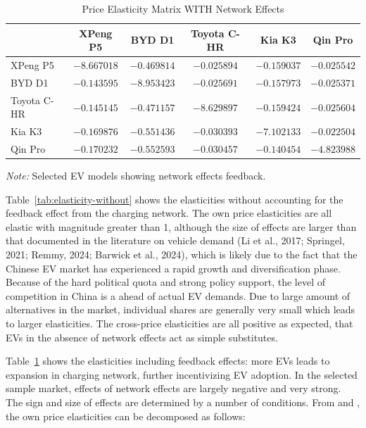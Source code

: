 \documentclass[12pt]{article}
\begin{document}
\begin{table}[!htbp]
\centering
\caption{Price Elasticity Matrix WITH Network Effects}
\label{tab:elasticity-with}
\begin{tabular}{@{}lccccc@{}}
\toprule
& XPeng P5 & BYD D1 & Toyota C-HR & Kia K3 & Qin Pro \\
\midrule
XPeng P5 & $-8.667018$ & $-0.469814$ & $-0.025894$ & $-0.159037$ & $-0.025542$ \\
BYD D1 & $-0.143595$ & $-8.953423$ & $-0.025691$ & $-0.157973$ & $-0.025371$ \\
Toyota C-HR & $-0.145145$ & $-0.471157$ & $-8.629897$ & $-0.159424$ & $-0.025604$ \\
Kia K3 & $-0.169876$ & $-0.551436$ & $-0.030393$ & $-7.102133$ & $-0.022504$ \\
Qin Pro & $-0.170232$ & $-0.552593$ & $-0.030457$ & $-0.140454$ & $-4.823988$ \\
\bottomrule
\end{tabular}
\footnotesize
\textit{Note:} Selected EV models showing network effects feedback.
\end{table}    

Table~\ref{tab:elasticity-without} shows the elasticities without accounting for the feedback effect from the charging network. 
The own price elasticities are all elastic with magnitude greater than 1, 
although the size of effects are larger than that documented in the literature on vehicle demand (Li et al., 2017; Springel, 2021; Remmy, 2024; Barwick et al., 2024),
which is likely due to the fact that the Chinese EV market has experienced a rapid growth and diversification phase. 
Because of the hard political quota and strong policy support, the level of competition in China is a ahead of actual EV demands.
Due to large amount of alternatives in the market, individual shares are generally very small which leads to larger elasticities.
The cross-price elasticities are all positive as expected, that EVs in the absence of network effects act as simple substitutes.

Table~\ref{tab:elasticity-with} shows the elasticities including feedback effects: more EVs leads to expansion in charging network, further incentivizing EV adoption.
In the selected sample market, effects of network effects are largely negative and very strong.
The sign and size of effects are determined by a number of conditions. From \citet{springel_network_2021} and \citet{remmy_adjustable_2024}, the own price elasticities can be decomposed as follows:
\end{document}
